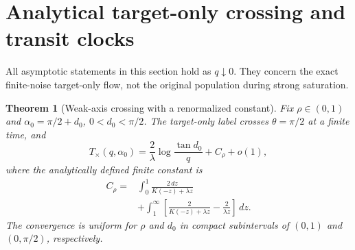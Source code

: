 \documentclass[11pt]{article}
\numberwithin{equation}{section}
\newtheorem{theorem}{Theorem}[section]\newtheorem{lemma}[theorem]{Lemma}
\theoremstyle{remark}\newtheorem{remark}[theorem]{Remark}
\newcommand{\dd}{\,d}\newcommand{\E}{\mathbb E}\newcommand{\R}{\mathbb R}
\begin{document}
\section{Analytical target-only crossing and transit clocks}
\label{inc:AN02:q2:v1:clocks}
All asymptotic statements in this section hold as $q\downarrow0$.
They concern the exact finite-noise target-only flow, not the original
population during strong saturation.

\begin{theorem}[Weak-axis crossing with a renormalized constant]
\label{inc:AN02:q2:v1:cross}
Fix $\rho\in(0,1)$ and $\alpha_0=\pi/2+d_0$, $0<d_0<\pi/2$.
The target-only label crosses $\theta=\pi/2$ at a finite time, and
\begin{equation}\label{inc:AN02:q2:v1:crosstime}
 T_\times(q,\alpha_0)
 =\frac2\lambda\log\frac{\tan d_0}{q}+C_\rho+o(1),
\end{equation}
where the analytically defined finite constant is
\begin{align}
 C_\rho={}&\int_0^1\frac{2\dd z}{K(-z)+\lambda z}\nonumber\\
 &+\int_1^\infty
 \left[\frac{2}{K(-z)+\lambda z}-\frac{2}{\lambda z}\right]\dd z.
 \label{inc:AN02:q2:v1:crossconstant}
\end{align}
The convergence is uniform for $\rho$ and $d_0$ in compact subintervals
of $(0,1)$ and $(0,\pi/2)$, respectively.
\end{theorem}
\end{document}
